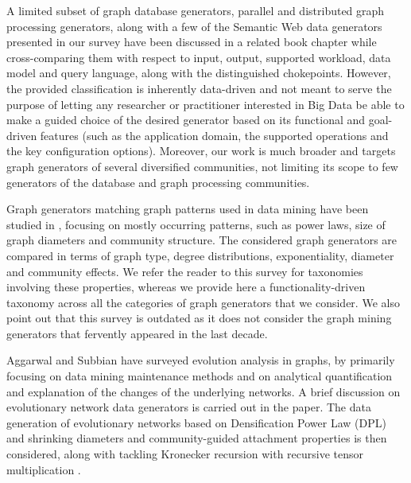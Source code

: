 A limited subset of graph database
generators, parallel and distributed graph processing generators, along
with a few of the Semantic Web data generators presented in our survey have
been discussed in a related book chapter
\cite{BFHI18} while cross-comparing them with respect to input, output,
supported workload, data model and query language, along with the
distinguished chokepoints. However, the provided classification is
inherently data-driven and not meant to serve the purpose of letting any
researcher or practitioner interested in Big Data be able to make a guided
choice of the desired 
generator based on its functional and goal-driven features (such as the application domain,
the supported operations and the key configuration options). 
Moreover, our work is much broader and targets graph generators of several 
diversified communities, not limiting its scope to few generators of the database
and graph processing communities. 

Graph generators matching graph patterns used in data mining have been
studied in \cite{Chakrabarti:2006:GML:1132952.1132954}, 
focusing on mostly occurring patterns, such as power laws, size of graph diameters
and community structure. The considered graph generators are compared in
terms of graph type, degree distributions, exponentiality, diameter and
community effects. We refer the reader to this survey for taxonomies
involving these properties, whereas we provide here a functionality-driven
taxonomy across all the categories of graph generators that we consider.    
We also point out that this survey is outdated as it does not consider the 
graph mining generators that fervently appeared in the last decade. 


Aggarwal and Subbian \cite{AggarwalS14} have surveyed evolution analysis in
graphs, by primarily focusing on data mining maintenance methods and on analytical 
quantification and explanation of the changes of the underlying networks. 
A brief discussion on evolutionary
network data generators is carried out in
the paper. The data generation of evolutionary networks based on 
Densification Power Law (DPL) and shrinking diameters \cite{LeskovecKF05} and community-guided
attachment properties \cite{LeskovecKF05} is then considered, along with tackling Kronecker
recursion with recursive tensor multiplication \cite{AkogluMF08}.
 



